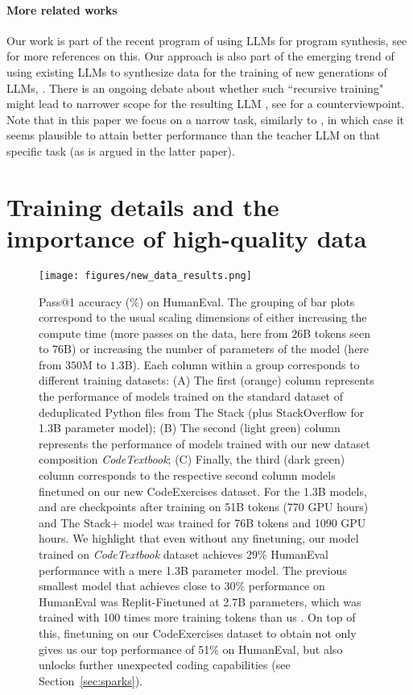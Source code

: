 \paragraph{More related works}
Our work is part of the recent program of using LLMs for program synthesis, see \cite{humaneval, codegen} for more references on this. Our approach is also part of the emerging trend of using existing LLMs to synthesize data for the training of new generations of LLMs, \cite{wang2022self, alpaca, mukherjee2023orca, lin2023differentially, jung2023impossible}. There is an ongoing debate about whether such ``recursive training" might lead to narrower scope for the resulting LLM \cite{shumailov2023model,gudibande2023false}, see \cite{mukherjee2023orca} for a counterviewpoint. Note that in this paper we focus on a narrow task, similarly to \cite{jung2023impossible}, in which case it seems plausible to attain better performance than the teacher LLM on that specific task (as is argued in the latter paper). 

\section{Training details and the importance of high-quality data} \label{sec:training}

\begin{figure}[htb]
\centering
\texttt{[image: figures/new\_data\_results.png]}
\caption{Pass@1 accuracy (\%) on HumanEval. %
The grouping of bar plots correspond to the usual scaling dimensions of either increasing the compute time (more passes on the data, here from $26$B tokens seen to $76$B) or increasing the number of parameters of the model (here from $350$M to $1.3$B). %
Each column within a group corresponds to different training datasets: (A) The first (orange) column represents the performance of models trained on the standard dataset of deduplicated Python files from The Stack (plus StackOverflow for 1.3B parameter model); (B) The second (light green) column represents the performance of models trained with our new dataset composition \textit{CodeTextbook}; (C) Finally, the third (dark green) column corresponds to the respective second column models finetuned on our new CodeExercises dataset.  %
{For the 1.3B models, \phione and \phionebase are checkpoints after training on 51B tokens (770 GPU hours) and The Stack+ model was trained for 76B tokens and 1090 GPU hours.}
We highlight %
that even without any finetuning, our \phionebase model trained on \textit{CodeTextbook} dataset achieves 29\% HumanEval performance with a mere 1.3B parameter model. The previous smallest model that achieves close to 30\% performance on HumanEval was Replit-Finetuned at 2.7B parameters, which was trained with 100 times more training tokens than us \cite{replit}. On top of this, finetuning on our CodeExercises dataset to obtain \phione not only gives us our top performance of 51\% on HumanEval, but also unlocks further unexpected coding capabilities (see Section~\ref{sec:sparks}).}
\label{fig:summary}
\end{figure}

